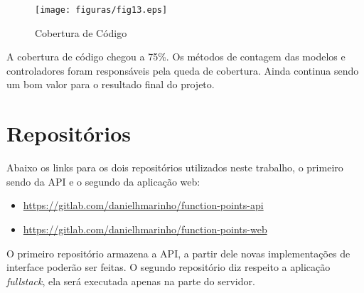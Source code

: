 \begin{figure}[H]
	\centering
	\texttt{[image: figuras/fig13.eps]}
	\caption{Cobertura de Código}
	\label{fig13}
\end{figure}

A cobertura de código chegou a 75\%. Os métodos de contagem das modelos e controladores foram responsáveis pela queda de cobertura. Ainda continua sendo um bom valor para  o resultado final do projeto.

\section{Repositórios}

Abaixo os links para os dois repositórios utilizados neste trabalho, o primeiro sendo da API e o segundo da aplicação web:

\begin{itemize}
  \item \url{https://gitlab.com/danielhmarinho/function-points-api}
	\item \url{https://gitlab.com/danielhmarinho/function-points-web}
\end{itemize}

O primeiro repositório armazena a API, a partir dele novas implementações de interface poderão ser feitas. O segundo repositório diz respeito a aplicação \textit{fullstack}, ela será executada apenas na parte do servidor.
